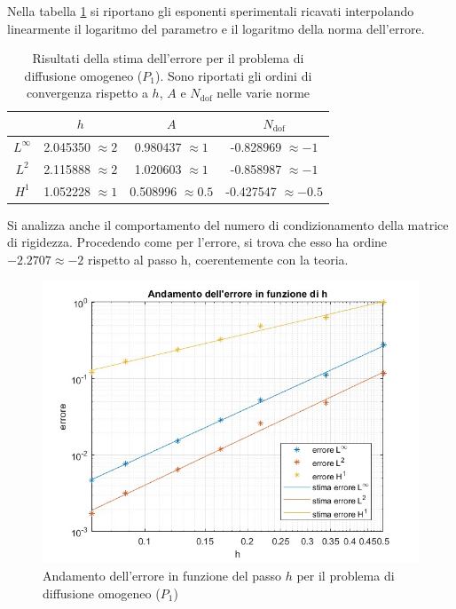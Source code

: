 \documentclass[%
	corpo=11pt,
    twoside,
    stile=classica,
    oldstyle,
    tipotesi=custom,
    greek,
    evenboxes,
]{toptesi}
\begin{document}
Nella tabella \ref{tab:stima_errore} si riportano gli esponenti sperimentali ricavati interpolando linearmente il logaritmo del parametro e il logaritmo della norma dell'errore.
\begin{table}[htbp]
  \centering
  \begin{tabular}{|c|c|c|c|}
    \cline{2-4}
    \multicolumn{1}{c|}{} & $h$ & $A$ & $N_{\text{dof}}$ \\
    \hline
    $L^\infty$ & 2.045350  $\approx 2$ & 0.980437 $\approx 1$ & -0.828969 $\approx -1$\\
    \hline
    $L^2$ & 2.115888  $\approx 2$ & 1.020603 $\approx 1$& -0.858987 $\approx -1$\\
    \hline
    $H^1$ & 1.052228  $\approx 1$ & 0.508996 $\approx 0.5$& -0.427547 $\approx -0.5$ \\
    \hline
  \end{tabular}
  \caption{Risultati della stima dell'errore per il problema di diffusione omogeneo ($P_1$). Sono riportati gli ordini di convergenza rispetto a $h$, $A$ e $N_{\text{dof}}$ nelle varie norme}
  \label{tab:stima_errore}
\end{table}

Si analizza anche  il comportamento del numero di condizionamento della matrice di rigidezza. Procedendo come per l'errore, si trova che esso ha ordine $-2.2707\approx-2$ rispetto al passo h, coerentemente con la teoria.

\begin{figure}[htbp]
  \centering
    \includegraphics[scale=0.4]{Pictures/errore_h_p1_omog.jpg}
    \caption{Andamento dell'errore in funzione del passo $h$ per il problema di diffusione omogeneo ($P_1$)}
    \label{fig:p1_h}
    \end{figure}
    
\end{document}
